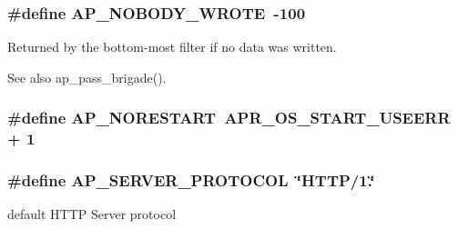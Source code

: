 \subsubsection[{\texorpdfstring{A\+P\+\_\+\+N\+O\+B\+O\+D\+Y\+\_\+\+W\+R\+O\+TE}{AP_NOBODY_WROTE}}]{\setlength{\rightskip}{0pt plus 5cm}\#define A\+P\+\_\+\+N\+O\+B\+O\+D\+Y\+\_\+\+W\+R\+O\+TE~-\/100}\hypertarget{group__APACHE__CORE__DAEMON_gab6541339293a2dc16d92208f9656ba02}{}\label{group__APACHE__CORE__DAEMON_gab6541339293a2dc16d92208f9656ba02}
Returned by the bottom-\/most filter if no data was written. \begin{DoxySeeAlso}{See also}
ap\+\_\+pass\+\_\+brigade(). 
\end{DoxySeeAlso}
\subsubsection[{\texorpdfstring{A\+P\+\_\+\+N\+O\+R\+E\+S\+T\+A\+RT}{AP_NORESTART}}]{\setlength{\rightskip}{0pt plus 5cm}\#define A\+P\+\_\+\+N\+O\+R\+E\+S\+T\+A\+RT~{\bf A\+P\+R\+\_\+\+O\+S\+\_\+\+S\+T\+A\+R\+T\+\_\+\+U\+S\+E\+E\+RR} + 1}\hypertarget{group__APACHE__CORE__DAEMON_ga52d3a802ce651d932f50d0885557e6fb}{}\label{group__APACHE__CORE__DAEMON_ga52d3a802ce651d932f50d0885557e6fb}
\subsubsection[{\texorpdfstring{A\+P\+\_\+\+S\+E\+R\+V\+E\+R\+\_\+\+P\+R\+O\+T\+O\+C\+OL}{AP_SERVER_PROTOCOL}}]{\setlength{\rightskip}{0pt plus 5cm}\#define A\+P\+\_\+\+S\+E\+R\+V\+E\+R\+\_\+\+P\+R\+O\+T\+O\+C\+OL~\char`\"{}H\+T\+TP/1.\char`\"{}}\hypertarget{group__APACHE__CORE__DAEMON_ga7432aed9e5cf19107a870f71c5bde58a}{}\label{group__APACHE__CORE__DAEMON_ga7432aed9e5cf19107a870f71c5bde58a}
default H\+T\+TP Server protocol 
